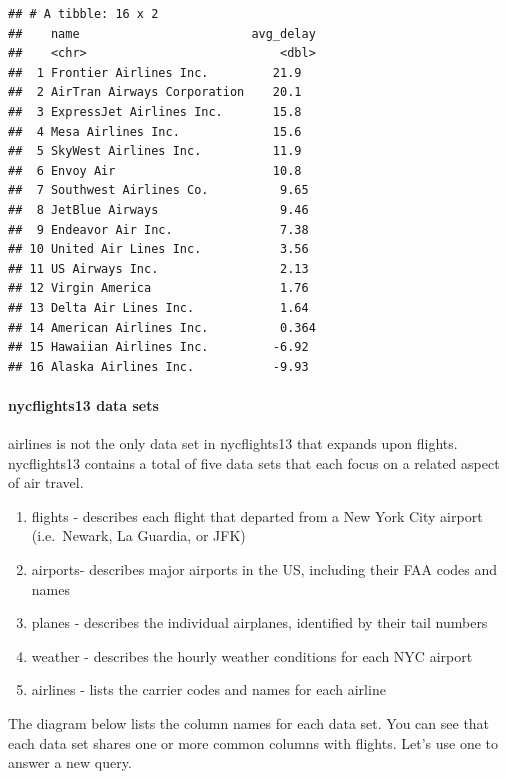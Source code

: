 \documentclass[
]{article}
\providecommand{\tightlist}{%
  \setlength{\itemsep}{0pt}\setlength{\parskip}{0pt}}
\begin{document}
\begin{verbatim}
## # A tibble: 16 x 2
##    name                        avg_delay
##    <chr>                           <dbl>
##  1 Frontier Airlines Inc.         21.9  
##  2 AirTran Airways Corporation    20.1  
##  3 ExpressJet Airlines Inc.       15.8  
##  4 Mesa Airlines Inc.             15.6  
##  5 SkyWest Airlines Inc.          11.9  
##  6 Envoy Air                      10.8  
##  7 Southwest Airlines Co.          9.65 
##  8 JetBlue Airways                 9.46 
##  9 Endeavor Air Inc.               7.38 
## 10 United Air Lines Inc.           3.56 
## 11 US Airways Inc.                 2.13 
## 12 Virgin America                  1.76 
## 13 Delta Air Lines Inc.            1.64 
## 14 American Airlines Inc.          0.364
## 15 Hawaiian Airlines Inc.         -6.92 
## 16 Alaska Airlines Inc.           -9.93
\end{verbatim}

\hypertarget{nycflights13-data-sets}{%
\paragraph{nycflights13 data sets}\label{nycflights13-data-sets}}

airlines is not the only data set in nycflights13 that expands upon
flights. nycflights13 contains a total of five data sets that each focus
on a related aspect of air travel.

\begin{enumerate}
\def\labelenumi{\arabic{enumi}.}
\tightlist
\item
  flights - describes each flight that departed from a New York City
  airport (i.e.~Newark, La Guardia, or JFK)
\item
  airports- describes major airports in the US, including their FAA
  codes and names
\item
  planes - describes the individual airplanes, identified by their tail
  numbers
\item
  weather - describes the hourly weather conditions for each NYC airport
\item
  airlines - lists the carrier codes and names for each airline
\end{enumerate}

The diagram below lists the column names for each data set. You can see
that each data set shares one or more common columns with flights. Let's
use one to answer a new query.
\end{document}
